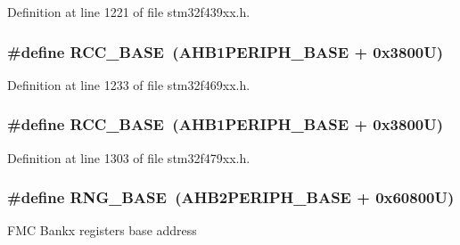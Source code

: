 Definition at line 1221 of file stm32f439xx.\+h.

\subsubsection[{\texorpdfstring{R\+C\+C\+\_\+\+B\+A\+SE}{RCC_BASE}}]{\setlength{\rightskip}{0pt plus 5cm}\#define R\+C\+C\+\_\+\+B\+A\+SE~({\bf A\+H\+B1\+P\+E\+R\+I\+P\+H\+\_\+\+B\+A\+SE} + 0x3800\+U)}\hypertarget{group___peripheral__memory__map_ga0e681b03f364532055d88f63fec0d99d}{}\label{group___peripheral__memory__map_ga0e681b03f364532055d88f63fec0d99d}


Definition at line 1233 of file stm32f469xx.\+h.

\subsubsection[{\texorpdfstring{R\+C\+C\+\_\+\+B\+A\+SE}{RCC_BASE}}]{\setlength{\rightskip}{0pt plus 5cm}\#define R\+C\+C\+\_\+\+B\+A\+SE~({\bf A\+H\+B1\+P\+E\+R\+I\+P\+H\+\_\+\+B\+A\+SE} + 0x3800\+U)}\hypertarget{group___peripheral__memory__map_ga0e681b03f364532055d88f63fec0d99d}{}\label{group___peripheral__memory__map_ga0e681b03f364532055d88f63fec0d99d}


Definition at line 1303 of file stm32f479xx.\+h.

\subsubsection[{\texorpdfstring{R\+N\+G\+\_\+\+B\+A\+SE}{RNG_BASE}}]{\setlength{\rightskip}{0pt plus 5cm}\#define R\+N\+G\+\_\+\+B\+A\+SE~({\bf A\+H\+B2\+P\+E\+R\+I\+P\+H\+\_\+\+B\+A\+SE} + 0x60800\+U)}\hypertarget{group___peripheral__memory__map_gab92662976cfe62457141e5b4f83d541c}{}\label{group___peripheral__memory__map_gab92662976cfe62457141e5b4f83d541c}
F\+MC Bankx registers base address 

